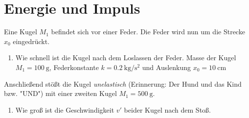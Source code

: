 \section{Energie und Impuls}
Eine Kugel $M_1$ befindet sich vor einer Feder.
Die Feder wird nun um die Strecke $x_0$ eingedrückt.
\begin{enumerate}
\item{ Wie schnell ist die Kugel nach dem Loslassen der Feder. Masse der Kugel $M_1=\SI{100}{\gram}$,
Federkonstante $k=\SI{0.2}{\kilo\gram\per\square\second}$ und Auslenkung $x_0=\SI{10}{\centi\meter}$}
\end{enumerate}
Anschließend stößt die Kugel \emph{unelastisch} (Erinnerung: Der Hund und das Kind bzw. "UND") mit einer zweiten Kugel $M_1=\SI{500}{\gram}$. %
\begin{enumerate}
\item {Wie groß ist die Geschwindigkeit $v'$ beider Kugel nach dem Stoß.}
\end{enumerate}
